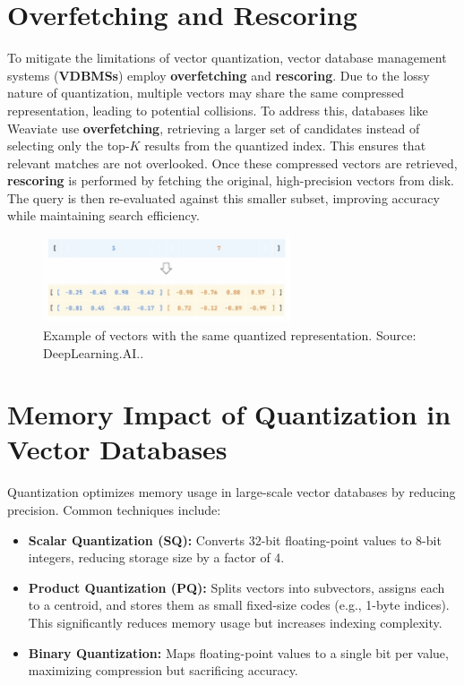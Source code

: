\section{Overfetching and Rescoring}
To mitigate the limitations of vector quantization, vector database management systems (\textbf{VDBMSs}) employ \textbf{overfetching} and \textbf{rescoring}. Due to the lossy nature of quantization, multiple vectors may share the same compressed representation, leading to potential collisions.
To address this, databases like Weaviate use \textbf{overfetching}, retrieving a larger set of candidates instead of selecting only the top-$K$ results from the quantized index. This ensures that relevant matches are not overlooked. Once these compressed vectors are retrieved, \textbf{rescoring} is performed by fetching the original, high-precision vectors from disk. The query is then re-evaluated against this smaller subset, improving accuracy while maintaining search efficiency.
\begin{figure}[h]
    \centering
\includegraphics[width=0.65\textwidth]{IMAGES/immagine_2025-02-27_123548078.png}
    \caption[Quantized representation collision]{Example of vectors with the same quantized representation. Source: DeepLearning.AI.\footnotemark.}
    \label{fig:Overfetching}
\end{figure}
\section{Memory Impact of Quantization in Vector Databases}
Quantization optimizes memory usage in large-scale vector databases by reducing precision. Common techniques include:
\begin{itemize}
    \item \textbf{Scalar Quantization (SQ):} Converts 32-bit floating-point values to 8-bit integers, reducing storage size by a factor of 4.
    \item \textbf{Product Quantization (PQ):} Splits vectors into subvectors, assigns each to a centroid, and stores them as small fixed-size codes (e.g., 1-byte indices). This significantly reduces memory usage but increases indexing complexity.
    \item \textbf{Binary Quantization:} Maps floating-point values to a single bit per value, maximizing compression but sacrificing accuracy.
\end{itemize}


